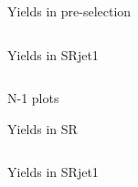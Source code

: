 \documentclass[mathserif,serif]{beamer}
\begin{document}
\begin{frame}{Yields in pre-selection}
\begin{table}[htbp]
\centering
\tiny

\begin{columns}

\begin{column}{0.5\textwidth}
\caption{\tiny Yields in SRjet1}
\end{column}

\begin{column}{0.5\textwidth}
\caption{\tiny Yields in SRjet23}
\end{column}

\end{columns}
\end{table}
\end{frame}



\begin{frame}
\begin{center}
\huge
N-1 plots
\end{center}
\end{frame}

\begin{frame}{Yields in SR}
\begin{table}[htbp]
\centering
\tiny

\begin{columns}

\begin{column}{0.5\textwidth}
\caption{\tiny Yields in SRjet1}
\end{column}

\begin{column}{0.5\textwidth}
\caption{\tiny Yields in SRjet23}
\end{column}

\end{columns}
\end{table}
\end{frame}
\end{document}
